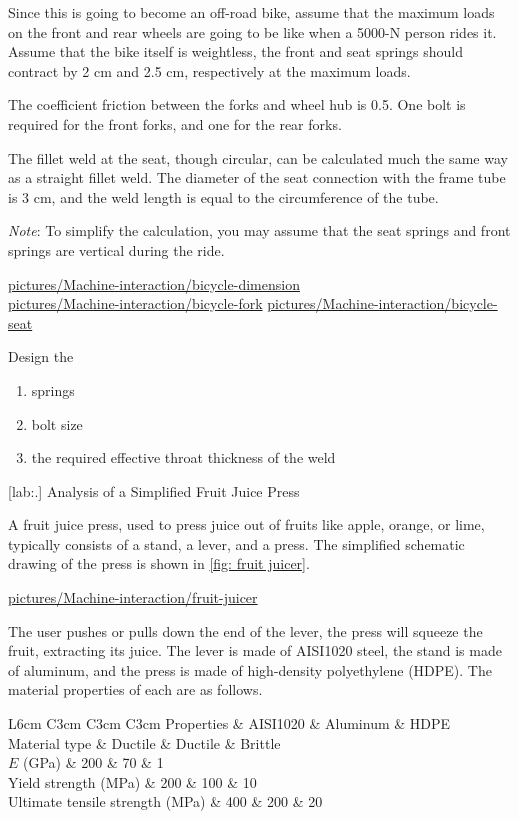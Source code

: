 \documentclass[a4paper,openany,nobib]{tufte-book}
\begin{document}
{{Since this is going to become an off-road bike, assume that the maximum
loads on the front and rear wheels are going to be like when a 5000-N
person rides it. Assume that the bike itself is weightless, the front
and seat springs should contract by 2 cm and 2.5 cm, respectively at the
maximum loads.

The coefficient friction between the forks and wheel hub is 0.5. One
bolt is required for the front forks, and one for the rear forks.

The fillet weld at the seat, though circular, can be calculated much the
same way as a straight fillet weld. The diameter of the seat connection
with the frame tube is 3 cm, and the weld length is equal to the
circumference of the tube.

\emph{Note}: To simplify the calculation, you may assume that the seat
springs and front springs are vertical during the ride.

\url{pictures/Machine-interaction/bicycle-dimension}\\
\url{pictures/Machine-interaction/bicycle-fork}
\url{pictures/Machine-interaction/bicycle-seat}

Design the

\begin{enumerate}
\item springs

\item bolt size

\item the required effective throat thickness of the weld
\end{enumerate}

[lab:.]
Analysis of a Simplified Fruit Juice Press

A fruit juice press, used to press juice out of fruits like apple,
orange, or lime, typically consists of a stand, a lever, and a press.
The simplified schematic drawing of the press is shown in
\ref{fig: fruit juicer}.


\url{pictures/Machine-interaction/fruit-juicer}

The user pushes or pulls down the end of the lever, the press will
squeeze the fruit, extracting its juice. The lever is made of AISI1020
steel, the stand is made of aluminum, and the press is made of
high-density polyethylene (HDPE). The material properties of each are as
follows.


 L6cm C3cm C3cm C3cm Properties \& AISI1020 \& Aluminum \& HDPE\\
Material type \& Ductile \& Ductile \& Brittle\\
\(E\) (GPa) \& 200 \& 70 \& 1\\
Yield strength (MPa) \& 200 \& 100 \& 10\\
Ultimate tensile strength (MPa) \& 400 \& 200 \& 20\\

}}
\end{document}
